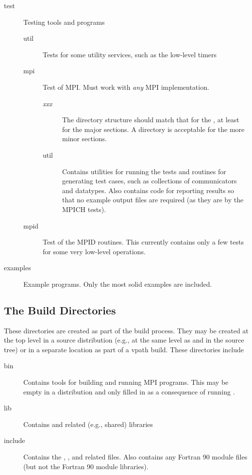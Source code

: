 \documentclass{article}
\begin{document}
\begin{description}
\item[test]Testing tools and programs
  \begin{description}
    \item[util]Tests for some utility services, such as the low-level timers
    \item[mpi]Test of MPI.  Must work with \emph{any} MPI implementation.
      \begin{description}
        \item[\emph{xxx}]The directory structure should match that for the
          , at least for the major sections.  A 
          directory is acceptable for the more minor sections.
        \item[util]Contains utilities for running the tests and routines
for generating test cases, such as collections of communicators and
datatypes.  Also contains code for reporting results so that no
example output files are required (as they are by the MPICH tests).
      \end{description}
    \item[mpid]Test of the MPID routines.  This currently contains
    only a few tests for some very low-level operations.
  \end{description}
\item[examples]Example programs.  Only the most solid examples are included.
\end{description}

\subsection{The Build Directories}
These directories are created as part of the build process.  They may
be created at the top level in a source distribution (e.g., at the
same level as  and  in the source tree) or in a
separate location as part of a vpath build.
These directories include
\begin{description}
\item[bin]Contains tools for building and running MPI programs.  This may be
  empty in a distribution and only filled in as a consequence of running
  .
\item[lib]Contains  and related (e.g., shared)
libraries
\item[include]Contains the , , and related
files.  Also contains any Fortran 90 module files (but not the Fortran
90 module libraries).
\end{description}
\end{document}

